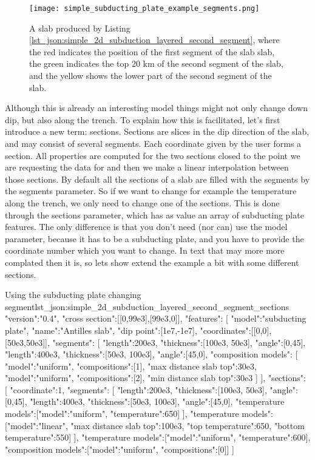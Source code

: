 \documentclass{book}
\begin{document}
\begin{figure}
    \centering
    \texttt{[image: simple\_subducting\_plate\_example\_segments.png]}
    \caption{A slab produced by Listing \ref{lst_json:simple_2d_subduction_layered_second_segment}, where the red indicates the position of the first segment of the slab slab, the green indicates the top 20 km of the second segment of the slab, and the yellow shows the lower part of the second segment of the slab.}
    \label{fig:simple_2d_subduction_2}
\end{figure}

Although this is already an interesting model things might not only change down dip, but also along the trench. To explain how this is facilitated, let's first introduce a new term: sections. Sections are slices in the dip direction of the slab, and may consist of several segments. Each coordinate given by the user forms a section. All properties are computed for the two sections closed to the point we are requesting the data for and then we make a linear interpolation between those sections. By default all the sections of a slab are filled with the segments by the segments parameter. So if we want to change for example the temperature along the trench, we only need to change one of the sections. This is done through the sections parameter, which has as value an array of subducting plate features. The only difference is that you don't need (nor can) use the model parameter, because it has to be a subducting plate, and you have to provide the coordinate number which you want to change. In text that may more more complated then it is, so lets show extend the example a bit with some different sections.

\begin{javascriptcode}{Using the subducting plate changing segment}{lst_json:simple_2d_subduction_layered_second_segment_sections}
{
  "version":"0.4",
  "cross section":[[0,99e3],[99e3,0]],
  "features":
  [
     {
       "model":"subducting plate", "name":"Antilles slab", "dip point":[1e7,-1e7],
       "coordinates":[[0,0],[50e3,50e3]],
       "segments":
       [
         {"length":200e3, "thickness":[100e3, 50e3], "angle":[0,45]},
         {
           "length":400e3, "thickness":[50e3, 100e3], "angle":[45,0],
           "composition models":
           [
             {"model":"uniform", "compositions":[1], "max distance slab top":30e3},
             {"model":"uniform", "compositions":[2], "min distance slab top":30e3}
           ]
         }
       ],
       "sections":
       [
         {
           "coordinate":1,
           "segments":
            [
              {"length":200e3, "thickness":[100e3, 50e3], "angle":[0,45]},
              {"length":400e3, "thickness":[50e3, 100e3], "angle":[45,0], 
                "temperature models":[{"model":"uniform", "temperature":650}]}
            ],
            "temperature models":[{"model":"linear", "max distance slab top":100e3, 
                                     "top temperature":650, "bottom temperature":550}]
         }
       ],
       "temperature models":[{"model":"uniform", "temperature":600}],
       "composition models":[{"model":"uniform", "compositions":[0]}]
    }
  ]
}
\end{javascriptcode}
\end{document}

